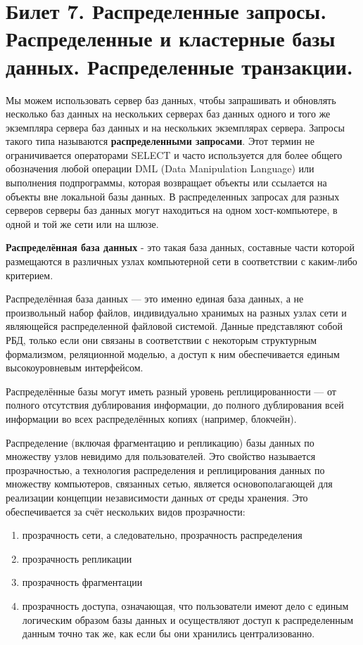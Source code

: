 \newpage
\section {Билет 7. Распределенные запросы. Распределенные и кластерные базы данных. Распределенные транзакции.}

Мы можем использовать сервер баз данных, чтобы запрашивать и обновлять несколько баз данных на нескольких серверах баз данных одного и того же экземпляра сервера баз данных и на нескольких экземплярах сервера. Запросы такого типа называются \textbf{распределенными запросами}. Этот термин не ограничивается операторами SELECT и часто используется для более общего обозначения любой операции DML (Data Manipulation Language) или выполнения подпрограммы, которая возвращает объекты или ссылается на объекты вне локальной базы данных.
В распределенных запросах для разных серверов серверы баз данных могут находиться на одном хост-компьютере, в одной и той же сети или на шлюзе.

\bigskip
\textbf{Распределённая база данных} - это такая база данных, составные части которой размещаются в различных узлах компьютерной сети в соответствии с каким-либо критерием.

Распределённая база данных — это именно единая база данных, а не произвольный набор файлов, индивидуально хранимых на разных узлах сети и являющейся распределенной файловой системой. Данные представляют собой РБД, только если они связаны в соответствии с некоторым структурным формализмом, реляционной моделью, а доступ к ним обеспечивается единым высокоуровневым интерфейсом.

Распределённые базы могут иметь разный уровень реплицированности — от полного отсутствия дублирования информации, до полного дублирования всей информации во всех распределённых копиях (например, блокчейн).

Распределение (включая фрагментацию и репликацию) базы данных по множеству узлов невидимо для пользователей. Это свойство называется прозрачностью, а технология распределения и реплицирования данных по множеству компьютеров, связанных сетью, является основополагающей для реализации концепции независимости данных от среды хранения. Это обеспечивается за счёт нескольких видов прозрачности:

\begin{enumerate}
	\item[\textbullet] прозрачность сети, а следовательно, прозрачность распределения
	\item[\textbullet] прозрачность репликации
	\item[\textbullet] прозрачность фрагментации
	\item[\textbullet] прозрачность доступа, означающая, что пользователи имеют дело с единым логическим образом базы данных и осуществляют доступ к распределенным данным точно так же, как если бы они хранились централизованно.
\end{enumerate}

